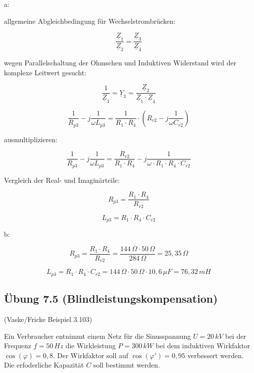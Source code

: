 \documentclass[
  ngerman,
  letterpaper,
]{scrbook}
\begin{document}
\begin{tcolorbox}[enhanced jigsaw, titlerule=0mm, rightrule=.15mm, toprule=.15mm, colback=white, toptitle=1mm, bottomrule=.15mm, coltitle=black, leftrule=.75mm, arc=.35mm, colbacktitle=quarto-callout-caution-color!10!white, opacityback=0, bottomtitle=1mm, colframe=quarto-callout-caution-color-frame, opacitybacktitle=0.6, breakable, title=\textcolor{quarto-callout-caution-color}{\faFire}\hspace{0.5em}{Lösung 7.4}, left=2mm]

a:

allgemeine Abgleichbedingung für Wechselstrombrücken:

\[\frac{\underline{Z}_1}{\underline{Z}_2} = \frac{\underline{Z}_3}{\underline{Z}_4}\]

wegen Parallelschaltung der Ohmschen und Induktiven Widerstand wird der
komplexe Leitwert gesucht:

\[\frac{1}{\underline{Z}_3} = \underline{Y}_3 = \frac{\underline{Z}_2}{\underline{Z}_1 \cdot \underline{Z}_4}\]

\[\frac{1}{R_{p3}} - j\frac{1}{\omega L_{p3}} = \frac{1}{R_1 \cdot R_4} \cdot \left( R_{r2} - j\frac{1}{\omega C_{r2}} \right)\]

ausmultiplizieren:

\[\frac{1}{R_{p3}} - j\frac{1}{\omega L_{p3}} = \frac{R_{r2}}{R_1 \cdot R_4} - j \frac{1}{\omega \cdot R_1 \cdot R_4 \cdot C_{r2}}\]

Vergleich der Real- und Imaginärteile:

\[R_{p3} = \frac{R_1 \cdot R_4}{R_{r2}}\]

\[L_{p3} = R_1 \cdot R_4 \cdot C_{r2}\]

b:

\[R_{p3} = \frac{R_1 \cdot R_4}{R_{r2}} = \frac{144\,\Omega \cdot 50\,\Omega}{284\,\Omega} = 25,35\,\Omega\]

\[L_{p3} = R_1 \cdot R_4 \cdot C_{r2} = 144\,\Omega \cdot 50\,\Omega \cdot 10,6\,\mu F = 76,32\,mH\]

\end{tcolorbox}

\subsection{Übung 7.5
(Blindleistungskompensation)}\label{uxfcbung-7.5-blindleistungskompensation}

(Vaske/Fricke Beispiel 3.103)

Ein Verbraucher entnimmt einem Netz für die Sinusspannung \(U = 20\,kV\)
bei der Frequenz \(f = 50\,Hz\) die Wirkleistung \(P = 300\,kW\) bei dem
induktiven Wirkfaktor \(\cos(\varphi) = 0,8\). Der Wirkfaktor soll auf
\(\cos(\varphi ') = 0,95\) verbessert werden. Die erfoderliche Kapazität
\(C\) soll bestimmt werden.
\end{document}

